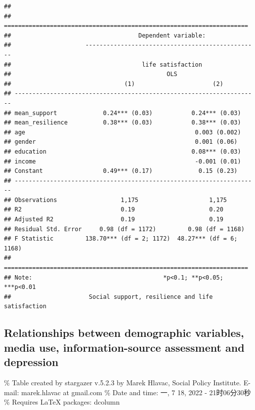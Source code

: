 \documentclass[
]{article}
\begin{document}
\begin{verbatim}
## 
## =====================================================================
##                                    Dependent variable:               
##                     -------------------------------------------------
##                                     life satisfaction                
##                                            OLS                       
##                                (1)                      (2)          
## ---------------------------------------------------------------------
## mean_support             0.24*** (0.03)           0.24*** (0.03)     
## mean_resilience          0.38*** (0.03)           0.38*** (0.03)     
## age                                                0.003 (0.002)     
## gender                                             0.001 (0.06)      
## education                                         0.08*** (0.03)     
## income                                             -0.001 (0.01)     
## Constant                 0.49*** (0.17)             0.15 (0.23)      
## ---------------------------------------------------------------------
## Observations                  1,175                    1,175         
## R2                            0.19                     0.20          
## Adjusted R2                   0.19                     0.19          
## Residual Std. Error     0.98 (df = 1172)         0.98 (df = 1168)    
## F Statistic         138.70*** (df = 2; 1172)  48.27*** (df = 6; 1168)
## =====================================================================
## Note:                                     *p<0.1; **p<0.05; ***p<0.01
##                      Social support, resilience and life satisfaction
\end{verbatim}

\hypertarget{relationships-between-demographic-variables-media-use-information-source-assessment-and-depression}{%
\subsection{Relationships between demographic variables, media use,
information-source assessment and
depression}\label{relationships-between-demographic-variables-media-use-information-source-assessment-and-depression}}

\% Table created by stargazer v.5.2.3 by Marek Hlavac, Social Policy
Institute. E-mail: marek.hlavac at gmail.com \% Date and time: 一, 7 18,
2022 - 21时06分30秒 \% Requires LaTeX packages: dcolumn
\end{document}
